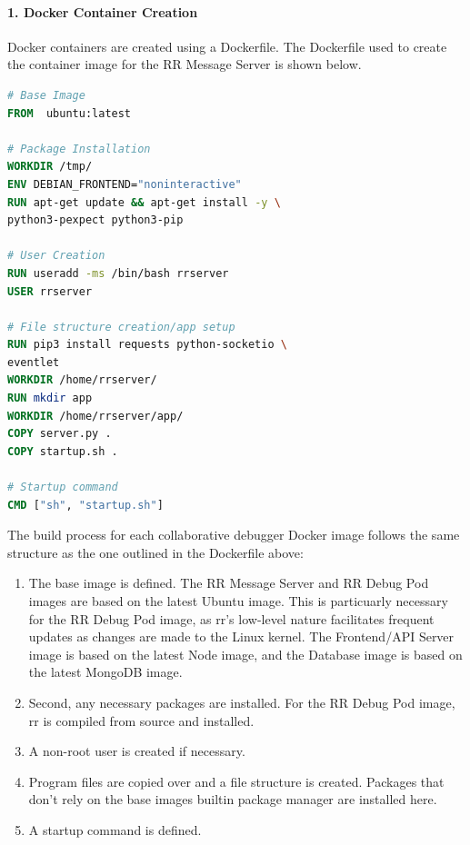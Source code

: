 \documentclass[12pt]{article}
\begin{document}
\paragraph{1. Docker Container Creation}

Docker containers are created using a Dockerfile.  The Dockerfile used
to create the container image for the RR Message
Server is shown below.\\

\begin{lstlisting}[language=Dockerfile,caption={RR Message Server Dockerfile},captionpos=b]
# Base Image
FROM  ubuntu:latest

# Package Installation
WORKDIR /tmp/
ENV DEBIAN_FRONTEND="noninteractive"
RUN apt-get update && apt-get install -y \
python3-pexpect python3-pip

# User Creation
RUN useradd -ms /bin/bash rrserver
USER rrserver

# File structure creation/app setup
RUN pip3 install requests python-socketio \
eventlet
WORKDIR /home/rrserver/
RUN mkdir app
WORKDIR /home/rrserver/app/
COPY server.py .
COPY startup.sh .

# Startup command
CMD ["sh", "startup.sh"]
\end{lstlisting}

The build process for each collaborative debugger Docker image follows
the same structure as the one outlined in the Dockerfile above:

\begin{enumerate}
\item The base image is defined. The RR Message Server and RR Debug
Pod images are based on the latest Ubuntu image.  This is particuarly
necessary for the RR Debug Pod image, as rr's low-level nature
facilitates frequent updates as changes are made to the Linux kernel.
The Frontend/API Server image is based on the latest Node image, and
the Database image is based on the latest MongoDB image.
\item Second, any necessary packages are installed.  For the RR Debug
  Pod image, rr is compiled from source and installed.
\item A non-root user is created if necessary.
\item Program files are copied over and a file structure is created.
  Packages that don't rely on the base images builtin package manager
  are installed here.
\item A startup command is defined.
\end{enumerate}
\end{document}
